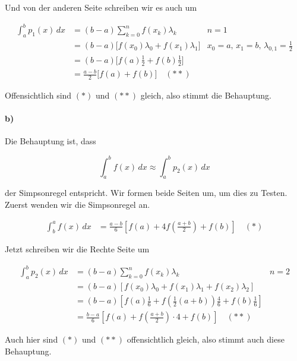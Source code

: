 \documentclass[ngerman,a4paper]{scrartcl}
\begin{document}
Und von der anderen Seite schreiben wir es auch um

\begin{align*}
  \int^b_a p_1(x)\, dx &= (b-a) \sum^n_{k=0} f(x_k) \lambda_k & n = 1\\
  &= (b-a)\big[f(x_0)\lambda_0 + f(x_1)\lambda_1\big] &  x_0 = a,\, x_1 = b,\, \lambda_{0,1}
  = \frac{1}{2}\\
  &= (b-a)\big[f(a)\frac{1}{2} + f(b)\frac{1}{2}\big]\\
  &= \frac{a-b}{2} \big[f(a) + f(b)\big] \quad (**)
\end{align*}

Offensichtlich sind $(*)$ und $(**)$ gleich, also stimmt die Behauptung.

\paragraph{b)}

Die Behauptung ist, dass 

\[
\int^b_a f(x)\, dx \approx \int^b_a p_2(x)\, dx
\]

der Simpsonregel entspricht. Wir formen beide Seiten um, um dies zu
Testen. Zuerst wenden wir die Simpsonregel an.

\begin{align*}
  \int^a_b f(x)\, dx &= \frac{a-b}{6} \left[ f(a) +
    4f\left(\frac{a+b}{2}\right) + f(b)\right] \quad (*)
\end{align*}

Jetzt schreiben wir die Rechte Seite um

\begin{align*}
  \int^b_a p_2(x)\, dx &= (b-a) \sum^n_{k=0} f(x_k) \lambda_k & n = 2\\
  &= (b-a)\left[f(x_0)\lambda_0 + f\left(x_1\right)\lambda_1 +
    f(x_2)\lambda_2\right]\\
  &= (b-a)\left[f(a)\frac{1}{6} +
    f\left(\frac{1}{2}(a+b)\right)\frac{4}{6} +
    f(b)\frac{1}{6}\right]\\
  &= \frac{b-a}{6} \left[f(a) + f\left(\frac{a+b}{2}\right)\cdot 4 +
    f(b) \right] \quad (**)
\end{align*}

Auch hier sind $(*)$ und $(**)$ offensichtlich gleich, also stimmt
auch diese Behauptung.
\end{document}
